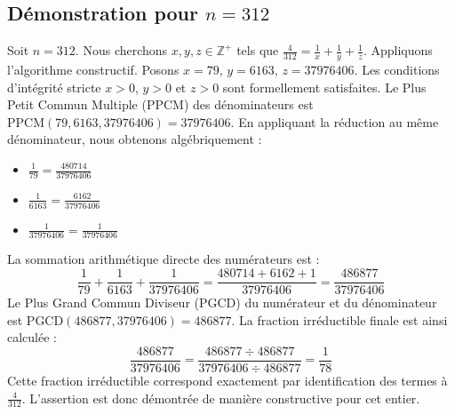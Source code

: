 \documentclass[11pt,a4paper]{article}
\begin{document}
\subsection{Démonstration pour $n = 312$}
Soit $n = 312$. Nous cherchons $x, y, z \in \mathbb{Z}^{+}$ tels que $\frac{4}{312} = \frac{1}{x} + \frac{1}{y} + \frac{1}{z}$.
Appliquons l'algorithme constructif. Posons $x = 79$, $y = 6163$, $z = 37976406$.
Les conditions d'intégrité stricte $x > 0$, $y > 0$ et $z > 0$ sont formellement satisfaites.
Le Plus Petit Commun Multiple (PPCM) des dénominateurs est $\text{PPCM}(79, 6163, 37976406) = 37976406$.
En appliquant la réduction au même dénominateur, nous obtenons algébriquement :
\begin{itemize}
    \item $\frac{1}{79} = \frac{480714}{37976406}$
    \item $\frac{1}{6163} = \frac{6162}{37976406}$
    \item $\frac{1}{37976406} = \frac{1}{37976406}$
\end{itemize}
La sommation arithmétique directe des numérateurs est :
$$ \frac{1}{79} + \frac{1}{6163} + \frac{1}{37976406} = \frac{480714 + 6162 + 1}{37976406} = \frac{486877}{37976406} $$
Le Plus Grand Commun Diviseur (PGCD) du numérateur et du dénominateur est $\text{PGCD}(486877, 37976406) = 486877$.
La fraction irréductible finale est ainsi calculée :
$$ \frac{486877}{37976406} = \frac{486877 \div 486877}{37976406 \div 486877} = \frac{1}{78} $$
Cette fraction irréductible correspond exactement par identification des termes à $\frac{4}{312}$. L'assertion est donc démontrée de manière constructive pour cet entier.
\end{document}
